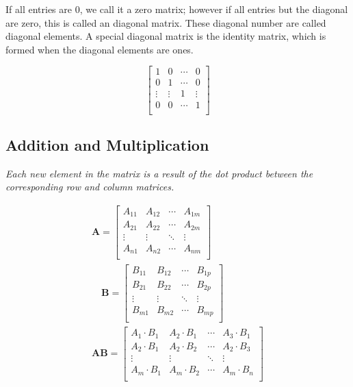 \documentclass[12pt,landscape,twocolumn]{article}
\begin{document}
    If all entries are 0, we call it a zero matrix; however if all entries but the diagonal are zero, this is called an diagonal matrix. These diagonal number are called diagonal elements. A special diagonal matrix is the identity matrix, which is formed when the diagonal elements are ones.

    \begin{equation}\label{eq:id_matrix}
        \left[ \begin{array}{cccc}
        1 & 0 & \cdots & 0\\
        0 & 1 & \cdots & 0\\
        \vdots & \vdots & 1 & \vdots\\
        0 & 0 & \cdots & 1\\
        \end{array} \right]
    \end{equation}

    \subsection{Addition and Multiplication}
    \begin{center}
        \textit{Each new element in the matrix is a result of the dot product between the corresponding row and column matrices.}
    \end{center}
    \begin{equation}\label{eq:matrixmultiplication}
    \begin{aligned}
        \mathbf{A}=
        \left[\begin{matrix}
        A_{11} & A_{12} & \cdots & A_{1m} \\
        A_{21} & A_{22} & \cdots & A_{2m} \\
        \vdots & \vdots & \ddots & \vdots \\
        A_{n1} & A_{n2} & \cdots & A_{nm} \\
        \end{matrix}\right]\\
        \quad\mathbf{B}=
        \left[\begin{matrix}
        B_{11} & B_{12} & \cdots & B_{1p} \\
        B_{21} & B_{22} & \cdots & B_{2p} \\
        \vdots & \vdots & \ddots & \vdots \\
        B_{m1} & B_{m2} & \cdots & B_{mp} \\
        \end{matrix}\right]\\
        \mathbf{A}\mathbf{B}=
        \left[\begin{matrix}
        A_1 \cdot B_1 & A_2 \cdot B_1 & \cdots & A_3 \cdot B_1 \\
        A_2 \cdot B_1 & A_2 \cdot B_2 & \cdots & A_2 \cdot B_3 \\
        \vdots & \vdots & \ddots & \vdots \\
        A_m \cdot B_1 & A_m \cdot B_2 & \cdots & A_m \cdot B_n \\
        \end{matrix}\right]
    \end{aligned}
    \end{equation}
\end{document}
